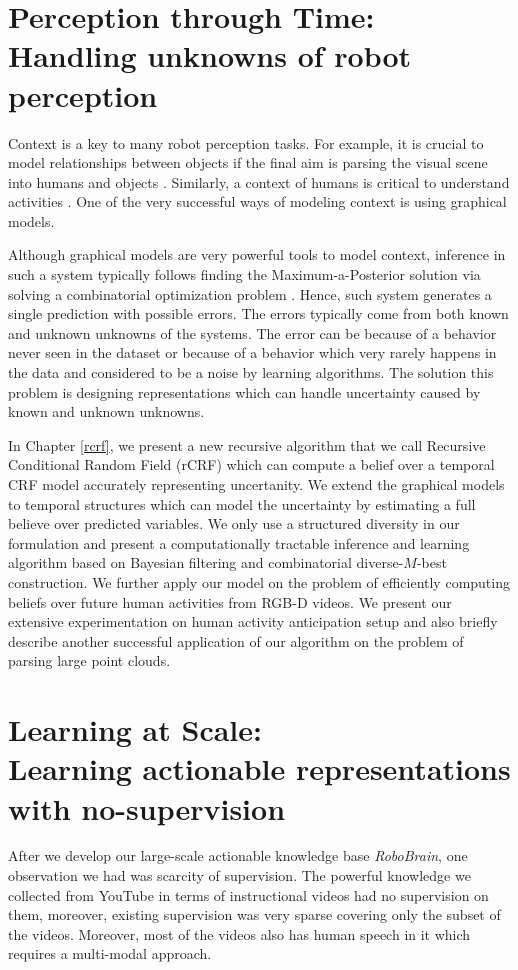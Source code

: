 \section{Perception through Time: \\  Handling unknowns of robot perception}
Context is a key to many robot perception tasks. For example, it is crucial to model relationships between objects if the final aim is parsing the visual scene into humans and objects \cite{KoppulaIJRR2012}. Similarly, a context of humans is critical to understand activities \cite{hemaIJRR, hall}. One of the very successful ways of modeling context is using graphical models. 

Although graphical models are very powerful tools to model context, inference in such a system typically follows finding the Maximum-a-Posterior solution via solving a combinatorial optimization problem . Hence, such system generates a single prediction with possible errors. The errors typically come from both known and unknown unknowns of the systems. The error can be because of a behavior never seen in the dataset or because of a behavior which very rarely happens in the data and considered to be a noise by learning algorithms. The solution this problem is designing representations which can handle uncertainty caused by known and unknown unknowns.

In Chapter \ref{rcrf}, we present a new recursive algorithm that we call Recursive Conditional Random Field (rCRF) which can compute a belief over a temporal CRF model accurately representing uncertanity. We extend the graphical models to temporal structures which can model the uncertainty by estimating a full believe over predicted variables. We only use a structured diversity in our formulation and present a computationally tractable inference and learning algorithm based on Bayesian filtering and combinatorial diverse-$M$-best construction. We further apply our model on the problem of efficiently computing beliefs over future human activities from RGB-D videos. We present our extensive experimentation on human activity anticipation setup and also briefly describe another successful application of our algorithm on the problem of parsing large point clouds.


\section{Learning at Scale: \\ Learning actionable representations with no-supervision}
After we develop our large-scale actionable knowledge base \emph{RoboBrain}, one observation we had was scarcity of supervision. The powerful knowledge we collected from YouTube in terms of instructional videos had no supervision on them, moreover, existing supervision was very sparse covering only the subset of the videos. Moreover, most of the videos also has human speech in it which requires a multi-modal approach.

